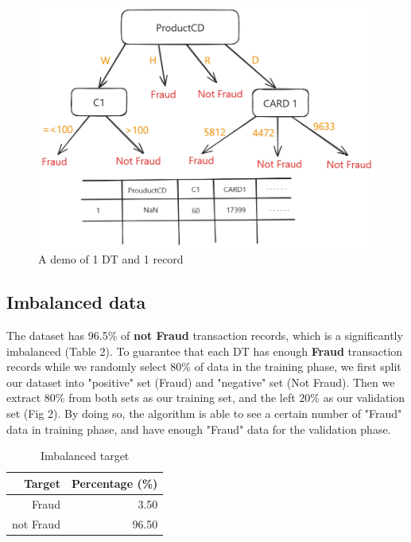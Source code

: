 \documentclass{article}
\begin{document}
\begin{figure}[H]
  \centering
  \includegraphics[width=1\linewidth]{Fig/NaN_test.jpg}
  \caption{A demo of 1 DT and 1 record}
\end{figure}


\subsection{Imbalanced data}
The dataset has 96.5\% of \textbf{not Fraud} transaction records, which is a significantly imbalanced (Table 2). To guarantee that each DT has enough \textbf{Fraud} transaction records while we randomly select 80\% of data in the training phase, we first split our dataset into "positive" set (Fraud) and "negative" set (Not Fraud). Then we extract 80\% from both sets as our training set, and the left 20\% as our validation set (Fig 2). By doing so, the algorithm is able to see a certain number of "Fraud" data in training phase, and have enough "Fraud" data for the validation phase.
\begin{table}[H]
    \centering        
    \begin{tabular}{r|r}
        Target & Percentage (\%)\\\hline
        Fraud& 3.50\\
        not Fraud& 96.50\\
    \end{tabular}
    \caption{Imbalanced target}
\end{table}
\end{document}
